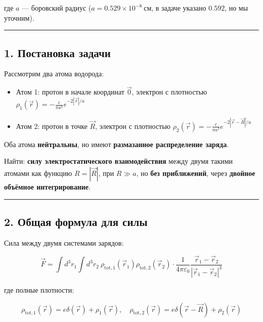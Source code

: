 \documentclass[11pt]{article}
\providecommand{\tightlist}{%
      \setlength{\itemsep}{0pt}\setlength{\parskip}{0pt}}
\begin{document}
где \(a\) --- боровский радиус (\(a = 0.529 \times 10^{-8}~\text{см}\),
в задаче указано \(0.592\), но мы уточним).

\begin{center}\rule{0.5\linewidth}{\linethickness}\end{center}

\subsection{1. Постановка
задачи}\label{ux43fux43eux441ux442ux430ux43dux43eux432ux43aux430-ux437ux430ux434ux430ux447ux438}

Рассмотрим два атома водорода:

\begin{itemize}
\tightlist
\item
  Атом 1: протон в начале координат \(\vec{0}\), электрон с плотностью
  \(\rho_1(\vec{r}) = -\frac{e}{\pi a^3} e^{-2|\vec{r}|/a}\)
\item
  Атом 2: протон в точке \(\vec{R}\), электрон с плотностью
  \(\rho_2(\vec{r}) = -\frac{e}{\pi a^3} e^{-2|\vec{r} - \vec{R}|/a}\)
\end{itemize}

Оба атома \textbf{нейтральны}, но имеют \textbf{размазанное
распределение заряда}.

Найти: \textbf{силу электростатического взаимодействия} между двумя
такими атомами как функцию \(R = |\vec{R}|\), при \(R \gg a\), но
\textbf{без приближений}, через \textbf{двойное объёмное
интегрирование}.

\begin{center}\rule{0.5\linewidth}{\linethickness}\end{center}

\subsection{2. Общая формула для
силы}\label{ux43eux431ux449ux430ux44f-ux444ux43eux440ux43cux443ux43bux430-ux434ux43bux44f-ux441ux438ux43bux44b}

Сила между двумя системами зарядов:

\[
\vec{F} = \int d^3r_1 \int d^3r_2\ \rho_{\text{tot},1}(\vec{r}_1) \rho_{\text{tot},2}(\vec{r}_2) \cdot \frac{1}{4\pi\varepsilon_0} \frac{ \vec{r}_1 - \vec{r}_2 }{ |\vec{r}_1 - \vec{r}_2|^3 }
\]

где полные плотности:

\[
\rho_{\text{tot},1}(\vec{r}) = e \delta(\vec{r}) + \rho_1(\vec{r}), \quad \rho_{\text{tot},2}(\vec{r}) = e \delta(\vec{r} - \vec{R}) + \rho_2(\vec{r})
\]
\end{document}
